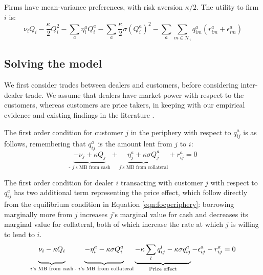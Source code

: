 Firms have mean-variance preferences, with risk aversion $\kappa/2$. The utility to firm $i$ is:
\begin{equation}
    \nu_{i}Q_{i}-\frac{\kappa}{2}Q^2_{i}-\sum_a \eta_{i}^a Q^a_{i}-\sum_a \frac{\kappa}{2}\sigma (Q^a_{i})^2-\sum_a \sum_{m \in \mathcal{N}_i}  q^a_{im}(r^a_{im}+\epsilon^a_{im})
\end{equation}


\subsection{Solving the model}

We first consider trades between dealers and customers, before considering inter-dealer trade. We assume that dealers have market power with respect to the customers, whereas customers are price takers, in keeping with our empirical evidence and existing findings in the literature \citep{eisenschmidt2022monetary, huber2023market}.

The first order condition for customer $j$ in the periphery with respect to $q^a_{ij}$ is as follows, remembering that $q^a_{ij}$ is the amount lent from $j$ to $i$:
\begin{equation}\label{eqn:focperiphery}
    \underbrace{-\nu_{j}+\kappa Q_{j}}_\text{- $j$'s MB from cash}+\underbrace{\eta^a_{j}+\kappa \sigma Q^a_{j}}_\text{$j$'s MB from collateral}+r^a_{ij}=0
\end{equation}

The first order condition for dealer $i$ transacting with customer $j$ with respect to $q^a_{ij}$ has two additional term representing the price effect, which follow directly from the equilibrium condition in Equation \ref{eqn:focperiphery}: borrowing marginally more from $j$ increases $j$'s marginal value for cash and decreases its marginal value for collateral, both of which increase the rate at which $j$ is willing to lend to $i$.
\begin{equation}\label{eqn:focdealer}
    \underbrace{\vphantom{\sum_m}\nu_{i}-\kappa Q_{i}}_\text{$i$'s MB from cash}\underbrace{-\eta^a_{i}-\kappa \sigma  Q^a_{i}\vphantom{\sum_m}}_\text{- $i$'s MB from collateral} \underbrace{-\kappa \sum_l q^l_{ij}-\kappa \sigma q^a_{ij} }_\text{Price effect}-\epsilon^a_{ij}-r^a_{ij}=0
\end{equation}

